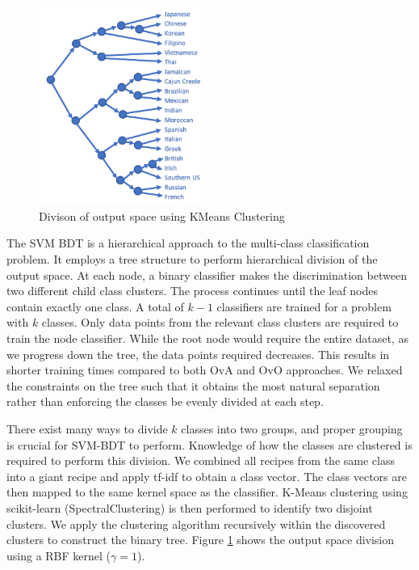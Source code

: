 \documentclass{article}
\def\light#1{{\color{light}#1}}
\begin{document}
\begin{figure}
\includegraphics[width=5.5cm]{BinaryTree.PNG}
\caption{Divison of output space using KMeans Clustering}
\label{img:binarytree}
\end{figure} 
The SVM BDT \cite{BDTSVM} is a hierarchical approach to the multi-class classification problem. It employs a tree structure to perform hierarchical division of the output space. At each node, a binary classifier makes the discrimination between two different child class clusters. The process continues until the leaf nodes contain exactly one class. A total of $k-1$ classifiers are trained for a problem with $k$ classes. Only data points from the relevant class clusters are required to train the node classifier. While the root node would require the entire dataset, as we progress down the tree, the data points required decreases. This results in shorter training times compared to both OvA and OvO approaches. We relaxed the constraints on the tree such that it obtains the most natural separation rather than enforcing the classes be evenly divided at each step. 

There exist many ways to divide $k$ classes into two groups, and proper grouping is crucial for SVM-BDT to perform. Knowledge of how the classes are clustered is required to perform this division. We combined all recipes from the same class into a giant recipe and apply tf-idf to obtain a class vector. The class vectors are then mapped to the same kernel space as the classifier. K-Means clustering using \light{scikit-learn (SpectralClustering)} is then performed to identify two disjoint clusters. We apply the clustering algorithm recursively within the discovered clusters to construct the binary tree. Figure \ref{img:binarytree} shows the output space division using a RBF kernel ($\gamma=1$).
\end{document}
